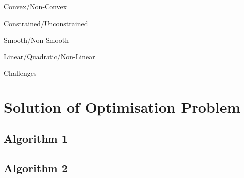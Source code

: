 \documentclass[10pt, a4paper]{amsart}
\begin{document}
Convex/Non-Convex

Constrained/Unconstrained

Smooth/Non-Smooth

Linear/Quadratic/Non-Linear

Challenges


\section{Solution of Optimisation Problem}

\subsection{Algorithm 1}\hfill

\subsection{Algorithm 2}\hfill
\end{document}
